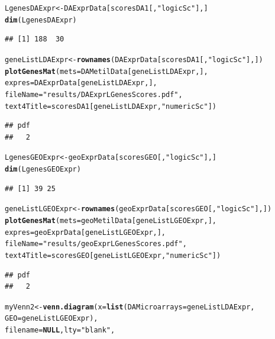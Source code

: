 \documentclass[a4paper,10pt]{article}\usepackage[]{graphicx}\usepackage[]{color}
\makeatletter
\newcommand{\hlstr}[1]{\textcolor[rgb]{0.192,0.494,0.8}{#1}}%
\newcommand{\hlstd}[1]{\textcolor[rgb]{0.345,0.345,0.345}{#1}}%
\newcommand{\hlkwa}[1]{\textcolor[rgb]{0.161,0.373,0.58}{\textbf{#1}}}%
\newcommand{\hlkwb}[1]{\textcolor[rgb]{0.69,0.353,0.396}{#1}}%
\newcommand{\hlkwc}[1]{\textcolor[rgb]{0.333,0.667,0.333}{#1}}%
\newcommand{\hlkwd}[1]{\textcolor[rgb]{0.737,0.353,0.396}{\textbf{#1}}}%
\newenvironment{kframe}{%
 \def\at@end@of@kframe{}%
 \ifinner\ifhmode%
  \def\at@end@of@kframe{\end{minipage}}%
  \begin{minipage}{\columnwidth}%
 \fi\fi%
 \def\FrameCommand##1{\hskip\@totalleftmargin \hskip-\fboxsep
 \colorbox{shadecolor}{##1}\hskip-\fboxsep
     \hskip-\linewidth \hskip-\@totalleftmargin \hskip\columnwidth}%
 \MakeFramed {\advance\hsize-\width
   \@totalleftmargin\z@ \linewidth\hsize
   \@setminipage}}%
 {\par\unskip\endMakeFramed%
 \at@end@of@kframe}
\newenvironment{knitrout}{}{} %
\makeatother
\begin{document}
\begin{knitrout}
\color{fgcolor}\begin{kframe}
\begin{alltt}
\hlstd{LgenesDAExpr} \hlkwb{<-} \hlstd{DAExprData[scoresDA1[,}\hlstr{"logicSc"}\hlstd{],]}
\hlkwd{dim}\hlstd{(LgenesDAExpr)}
\end{alltt}
\begin{verbatim}
## [1] 188  30
\end{verbatim}
\begin{alltt}
\hlstd{geneListLDAExpr} \hlkwb{<-} \hlkwd{rownames}\hlstd{(DAExprData[scoresDA1[,}\hlstr{"logicSc"}\hlstd{],])}
\hlkwd{plotGenesMat} \hlstd{(}\hlkwc{mets}\hlstd{=DAMetilData[geneListLDAExpr,],}
              \hlkwc{expres}\hlstd{=DAExprData[geneListLDAExpr,],}
              \hlkwc{fileName} \hlstd{=}\hlstr{"results/DAExprLGenesScores.pdf"}\hlstd{,}
              \hlkwc{text4Title} \hlstd{= scoresDA1[geneListLDAExpr,}\hlstr{"numericSc"}\hlstd{])}
\end{alltt}
\begin{verbatim}
## pdf 
##   2
\end{verbatim}
\begin{alltt}
\hlstd{LgenesGEOExpr} \hlkwb{<-} \hlstd{geoExprData[scoresGEO[,}\hlstr{"logicSc"}\hlstd{],]}
\hlkwd{dim}\hlstd{(LgenesGEOExpr)}
\end{alltt}
\begin{verbatim}
## [1] 39 25
\end{verbatim}
\begin{alltt}
\hlstd{geneListLGEOExpr} \hlkwb{<-} \hlkwd{rownames}\hlstd{(geoExprData[scoresGEO[,}\hlstr{"logicSc"}\hlstd{],])}
\hlkwd{plotGenesMat} \hlstd{(}\hlkwc{mets}\hlstd{=geoMetilData[geneListLGEOExpr,],}
              \hlkwc{expres}\hlstd{=geoExprData[geneListLGEOExpr,],}
              \hlkwc{fileName} \hlstd{=}\hlstr{"results/geoExprLGenesScores.pdf"}\hlstd{,}
              \hlkwc{text4Title} \hlstd{= scoresGEO[geneListLGEOExpr,}\hlstr{"numericSc"}\hlstd{])}
\end{alltt}
\begin{verbatim}
## pdf 
##   2
\end{verbatim}
\begin{alltt}
\hlstd{myVenn2}\hlkwb{<-} \hlkwd{venn.diagram}\hlstd{(}\hlkwc{x}\hlstd{=}\hlkwd{list}\hlstd{(}\hlkwc{DAMicroarrays}\hlstd{=geneListLDAExpr,}
                              \hlkwc{GEO}\hlstd{=geneListLGEOExpr),}
                              \hlkwc{filename}\hlstd{=}\hlkwa{NULL}\hlstd{,} \hlkwc{lty} \hlstd{=} \hlstr{"blank"}\hlstd{,}

\end{alltt}
\end{kframe}
\end{knitrout}
\end{document}
